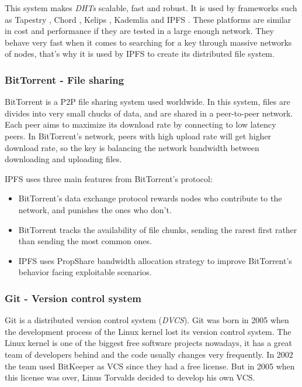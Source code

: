 This system makes \emph{DHTs} scalable, fast and robust. It is used by
frameworks such as Tapestry \cite{zhao2004tapestry}, Chord
\cite{stoica2001chord}, Kelips \cite{gupta2003kelips}, Kademlia
\cite{maymounkov2002kademlia} and IPFS \cite{benet2014ipfs}. These platforms are
similar in cost and performance if they are tested in a large enough network.
They behave very fast when it comes to searching for a key through massive
networks of nodes\cite{li2004comparing}, that's why it is used by IPFS to create
its distributed file system.

\subsubsection*{BitTorrent - File sharing}
\label{tech:sec:ipfs:bt}
BitTorrent \cite{cohen2003incentives} is a P2P file sharing system used
worldwide. In this system, files are divides into very small chucks of data, and
are shared in a peer-to-peer network. Each peer aims to maximize its download
rate by connecting to low latency peers. In BitTorrent's network, peers with
high upload rate will get higher download rate, so the key is balancing the
network bandwidth between downloading and uploading
files\cite{pouwelse2005bittorrent}.

IPFS uses three main features from BitTorrent's protocol\cite{benet2014ipfs}:
\begin{itemize}
\item BitTorrent's data exchange protocol rewards nodes who contribute to the
  network, and punishes the ones who don't.
\item BitTorrent tracks the availability of file chunks, sending the rarest
  first rather than sending the most common ones.
\item IPFS uses PropShare\cite{levin2008bittorrent} bandwidth allocation
  strategy to improve BitTorrent's behavior facing exploitable scenarios.
\end{itemize}

\subsubsection*{Git - Version control system}
\label{tech:sec:ipfs:git}
Git is a distributed version control system (\emph{DVCS})\cite{torvalds2010git}.
Git was born in 2005 when the development process of the Linux kernel lost its
version control system. The Linux kernel is one of the biggest free software
projects nowadays, it has a great team of developers behind and the code usually
changes very frequently. In 2002 the team used BitKeeper as VCS since they had a
free license. But in 2005 when this license was over, Linus Torvalds decided to
develop his own VCS\cite{spinellis2005version}.

